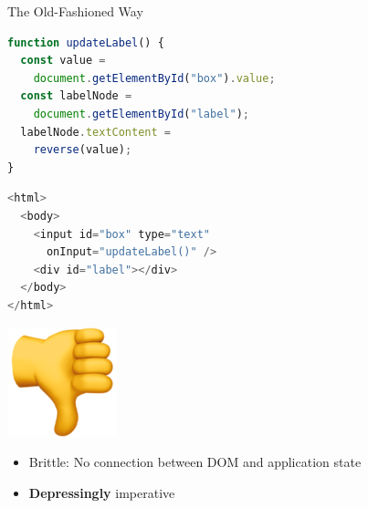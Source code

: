 
\begin{frame}[fragile]{The Old-Fashioned Way}


  \begin{minipage}{0.6\textwidth}
\begin{lstlisting}[language=JavaScript]
function updateLabel() {
  const value =
    document.getElementById("box").value;
  const labelNode =
    document.getElementById("label");
  labelNode.textContent =
    reverse(value);
}
\end{lstlisting}
\begin{lstlisting}[language=JavaScript]
<html>
  <body>
    <input id="box" type="text"
      onInput="updateLabel()" />
    <div id="label"></div>
  </body>
</html>
\end{lstlisting}%
\end{minipage}
\hfill
\begin{minipage}{0.35\textwidth}
\end{minipage}
\end{frame}

\begin{frame}[plain]
  \begin{center}
    \includegraphics{images/boo.png}
  \end{center}

  {\Large
    \begin{itemize}
      \item Brittle: No connection between DOM and application state
      \item \textbf{Depressingly} imperative
    \end{itemize}
  }
\end{frame}


